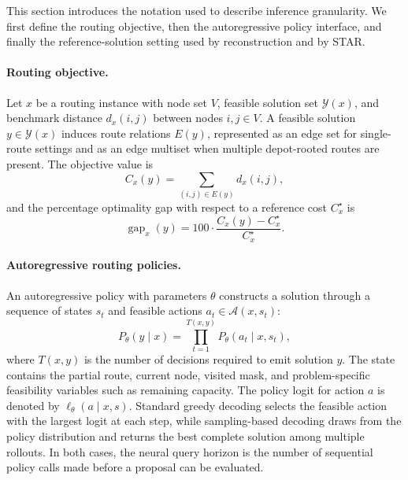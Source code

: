 \documentclass[11pt]{article}
\newcommand{\method}{\textsc{STAR}}
\newcommand{\cA}{\mathcal{A}}
\newcommand{\cY}{\mathcal{Y}}
\newcommand{\cost}{C}
\newcommand{\gap}{\operatorname{gap}}
\begin{document}
This section introduces the notation used to describe inference granularity. We first define the routing objective, then the autoregressive policy interface, and finally the reference-solution setting used by reconstruction and by \method{}.

\paragraph{Routing objective.}
Let $x$ be a routing instance with node set $V$, feasible solution set $\cY(x)$, and benchmark distance $d_x(i,j)$ between nodes $i,j\in V$. A feasible solution $y\in\cY(x)$ induces route relations $E(y)$, represented as an edge set for single-route settings and as an edge multiset when multiple depot-rooted routes are present. The objective value is
\begin{equation}
  \cost_x(y)=\sum_{(i,j)\in E(y)}d_x(i,j),
  \label{eq:cost}
\end{equation}
and the percentage optimality gap with respect to a reference cost $\cost_x^\star$ is
\begin{equation}
  \gap_x(y)=100\cdot\frac{\cost_x(y)-\cost_x^\star}{\cost_x^\star}.
  \label{eq:gap}
\end{equation}

\paragraph{Autoregressive routing policies.}
An autoregressive policy with parameters $\theta$ constructs a solution through a sequence of states $s_t$ and feasible actions $a_t\in\cA(x,s_t)$:
\begin{equation}
  P_\theta(y\mid x)=\prod_{t=1}^{T(x,y)}P_\theta(a_t\mid x,s_t),
  \label{eq:ar}
\end{equation}
where $T(x,y)$ is the number of decisions required to emit solution $y$. The state contains the partial route, current node, visited mask, and problem-specific feasibility variables such as remaining capacity. The policy logit for action $a$ is denoted by $\ell_\theta(a\mid x,s)$. Standard greedy decoding selects the feasible action with the largest logit at each step, while sampling-based decoding draws from the policy distribution and returns the best complete solution among multiple rollouts. In both cases, the neural query horizon is the number of sequential policy calls made before a proposal can be evaluated.
\end{document}
